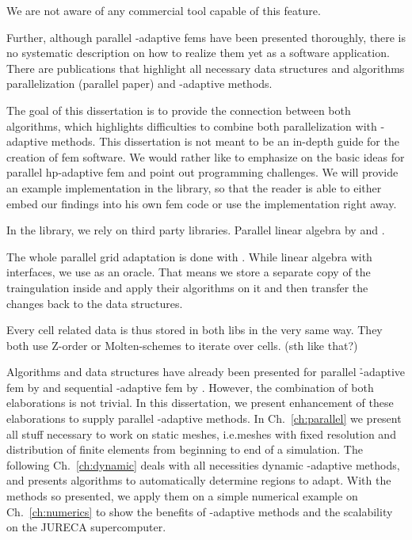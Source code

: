 We are not aware of any commercial tool capable of this feature.



Further, although parallel \hp-adaptive \glspl{fem} have been presented thoroughly, there is no systematic description on how to realize them yet as a software application. There are publications that highlight all necessary data structures and algorithms parallelization (parallel paper) and \hp-adaptive methods. %

The goal of this dissertation is to provide the connection between both algorithms, which highlights difficulties to combine both parallelization with \hp-adaptive methods. This dissertation is not meant to be an in-depth guide for the creation of \gls{fem} software. We would rather like to emphasize on the basic ideas for parallel hp-adaptive \gls{fem} and point out programming challenges. We will provide an example implementation in the \dealii{} library, so that the reader is able to either embed our findings into his own \gls{fem} code or use the \dealii{} implementation right away.

In the \dealii{} library, we rely on third party libraries. Parallel linear algebra by \trilinos{} \parencite{heroux2005,trilinos12181} and \petsc{} \parencite{balay2019,petsc3124}.

The whole parallel grid adaptation is done with \pforest{} \parencite{burstedde2011, p4est22}. While linear algebra with interfaces, we use \pforest{} as an oracle. That means we store a separate copy of the traingulation inside \pforest{} and apply their algorithms on it and then transfer the changes back to the \dealii{} data structures.

Every cell related data is thus stored in both libs in the very same way. They both use Z-order or Molten-schemes to iterate over cells. (sth like that?)


Algorithms and data structures have already been presented for parallel \h-adaptive \gls{fem} by \textcite{bangerth2012} and sequential \hp-adaptive \gls{fem} by \textcite{bangerth2009}. However, the combination of both elaborations is not trivial. In this dissertation, we present enhancement of these elaborations to supply parallel \hp-adaptive methods. In Ch.~\ref{ch:parallel} we present all stuff necessary to work on static meshes, i.e.\@ meshes with fixed resolution and distribution of finite elements from beginning to end of a simulation. The following Ch.~\ref{ch:dynamic} deals with all necessities dynamic \hp-adaptive methods, and presents algorithms to automatically determine regions to adapt. With the methods so presented, we apply them on a simple numerical example on Ch.~\ref{ch:numerics} to show the benefits of \hp-adaptive methods and the scalability on the JURECA supercomputer.

